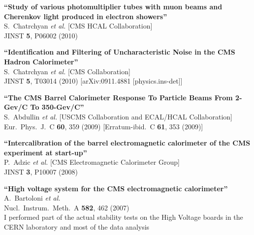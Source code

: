 \documentclass[10pt, a4paper]{article}
\begin{document}
\begin{thebibliography}{599}

{\bf ``Study of various photomultiplier tubes with muon beams and Cherenkov light produced in electron showers''}
  \\{}S.~Chatrchyan {\it et al.}  [CMS HCAL Collaboration]
  \\{}JINST {\bf 5}, P06002 (2010)

{\bf ``Identification and Filtering of Uncharacteristic Noise in the CMS Hadron Calorimeter''}
  \\{}S.~Chatrchyan {\it et al.}  [CMS Collaboration]
  \\{}JINST {\bf 5}, T03014 (2010)
  [arXiv:0911.4881 [physics.ins-det]]

{\bf ``The CMS Barrel Calorimeter Response To Particle Beams From 2-Gev/C To 350-Gev/C''}
  \\{}S.~Abdullin {\it et al.}  [USCMS Collaboration and ECAL/HCAL
                  Collaboration]
  \\{}Eur.\ Phys.\ J.\  C {\bf 60}, 359 (2009)
  [Erratum-ibid.\  C {\bf 61}, 353 (2009)]

{\bf ``Intercalibration of the barrel electromagnetic calorimeter of the CMS  experiment at start-up''}
  \\{}P.~Adzic {\it et al.}  [CMS Electromagnetic Calorimeter Group]
  \\{}JINST {\bf 3}, P10007 (2008)

{\bf ``High voltage system for the CMS electromagnetic calorimeter''}
  \\{}A.~Bartoloni {\it et al.}
  \\{}Nucl.\ Instrum.\ Meth.\  A {\bf 582}, 462 (2007)
  \\ I performed part of the actual stability tests on the High Voltage boards in the CERN laboratory and most of the data analysis 


\end{thebibliography}
\end{document}
